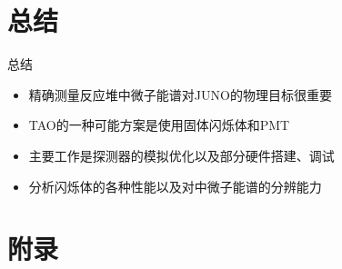 \documentclass[11pt,compress,xcolor=x11names,UTF8]{beamer}
\begin{document}
\section{总结}

\begin{frame}{总结}
\begin{itemize}
\item 精确测量反应堆中微子能谱对JUNO的物理目标很重要
\item  TAO的一种可能方案是使用固体闪烁体和PMT
\item  主要工作是探测器的模拟优化以及部分硬件搭建、调试 
\item  分析闪烁体的各种性能以及对中微子能谱的分辨能力
\end{itemize}
\end{frame}

\begin{frame}
\end{frame}


%
%

\appendix

\section*{附录}

%
%

\end{document}
